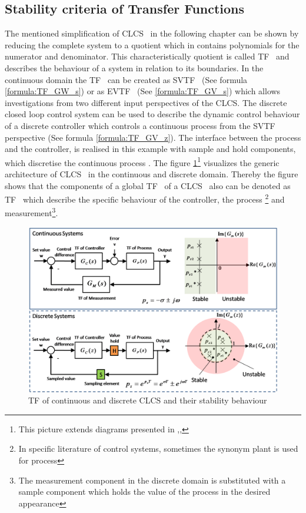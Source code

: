 \subsection{Stability criteria of Transfer Functions}
\label{mt:c:literature:s:Stability_criteria_of_transfer_functions}
The mentioned simplification of \gls{CLCS}~ in the following chapter can be shown by
reducing the complete system to a quotient which in contains polynomials for the
numerator and denominator.
This characteristically quotient is called \gls{TF}~ and
describes the behaviour of a system in relation to its boundaries. In the
continuous domain the \gls{TF}~ can be created as \gls{SVTF}~ (See formula
\ref{formula:TF_GW_s}) or as \gls{EVTF}~ (See \ref{formula:TF_GV_s}) which
allows investigations from two different input perspectives of the \gls{CLCS}. The
discrete closed loop control system can be used to describe the dynamic control
behaviour of a discrete controller which controls a continuous process from the
\gls{SVTF}~ perspective (See formula \ref{formula:TF_GV_z}). The interface between
the process and the controller, is realised in this example with sample and hold
components, which discretise the continuous process . The figure
\ref{fig:TransferFunctions.png}\footnote{This picture extends diagrams presented in ,, } visualizes the generic architecture of \gls{CLCS}~
in the continuous and discrete domain. Thereby the figure shows that the components
of a global \gls{TF}~ of a \gls{CLCS}~ also can be denoted as \gls{TF}~ which describe the
specific behaviour of the controller, the process \footnote{In specific literature of
control systems, sometimes the synonym plant is used for process} and
measurement\footnote{The measurement component in the discrete domain is
substituted with a sample component which holds the value of the process in the
desired appearance}.


\begin{figure}[H]
	\centering
		\includegraphics[width=1\textwidth]{graphic/TransferFunctions.png}
\caption{TF of continuous and discrete CLCS and their stability behaviour}
	\label{fig:TransferFunctions.png}
\end{figure}

